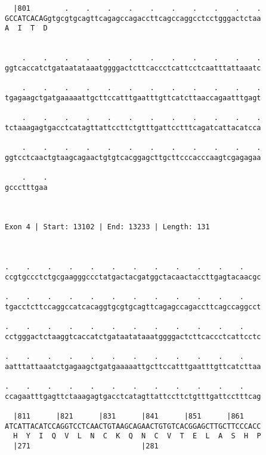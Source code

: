 \documentclass{article}
\begin{document}
\begin{Verbatim}
  |801        .    .    .    .    .    .    .    .    .    .
GCCATCACAGgtgcgtgcagttcagagccagaccttcagccaggcctcctgggactctaa
A  I  T  D                                                  
                                                            
  
    .    .    .    .    .    .    .    .    .    .    .    .
ggtcaccatctgataatataaatggggactcttcaccctcattcctcaatttattaaatc
                                                            
    .    .    .    .    .    .    .    .    .    .    .    .
tgagaagctgatgaaaaattgcttccatttgaatttgttcatcttaaccagaatttgagt
                                                            
    .    .    .    .    .    .    .    .    .    .    .    .
tctaaagagtgacctcatagttattccttctgtttgattcctttcagatcattacatcca
                                                            
    .    .    .    .    .    .    .    .    .    .    .    .
ggtcctcaactgtaagcagaactgtgtcacggagcttgcttcccacccaagtcgagagaa
                                                            
    .    .
gccctttgaa
          
          
 
Exon 4 | Start: 13102 | End: 13233 | Length: 131



.    .    .    .    .    .    .    .    .    .    .    .    
ccgtgccctctgcgaagggccctatgactacgatggctacaactaccttgagtacaacgc
                                                            
.    .    .    .    .    .    .    .    .    .    .    .    
tgacctcttccaggccatcacaggtgcgtgcagttcagagccagaccttcagccaggcct
                                                            
.    .    .    .    .    .    .    .    .    .    .    .    
cctgggactctaaggtcaccatctgataatataaatggggactcttcaccctcattcctc
                                                            
.    .    .    .    .    .    .    .    .    .    .    .    
aatttattaaatctgagaagctgatgaaaaattgcttccatttgaatttgttcatcttaa
                                                            
.    .    .    .    .    .    .    .    .    .    .    .    
ccagaatttgagttctaaagagtgacctcatagttattccttctgtttgattcctttcag
                                                            
  |811      |821      |831      |841      |851      |861    
ATCATTACATCCAGGTCCTCAACTGTAAGCAGAACTGTGTCACGGAGCTTGCTTCCCACC
  H  Y  I  Q  V  L  N  C  K  Q  N  C  V  T  E  L  A  S  H  P
  |271                          |281                        
  

\end{Verbatim}
\end{document}
